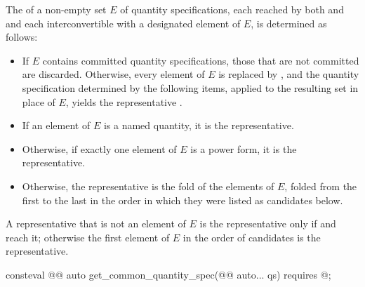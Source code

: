 \pnum
The  of a non-empty set $E$ of quantity specifications,
each reached by both  and 
and each interconvertible with a designated element  of $E$,
is determined as follows:
\begin{itemize}
\item
If $E$ contains committed quantity specifications, those that are not committed are discarded.
Otherwise, every element  of $E$ is replaced by ,
and the quantity specification  determined by the following items,
applied to the resulting set in place of $E$, yields the representative .
\item
If an element of $E$ is a named quantity, it is the representative.
\item
Otherwise, if exactly one element of $E$ is a power form, it is the representative.
\item
Otherwise, the representative is the fold of the elements of $E$, folded from the first to the last
in the order in which they were listed as candidates below.
\end{itemize}
A representative that is not an element of $E$ is the representative only if  and  reach it;
otherwise the first element of $E$ in the order of candidates is the representative.

\begin{itemdecl}
consteval @@ auto get_common_quantity_spec(@@ auto... qs)
  requires @\seebelownc@;
\end{itemdecl}

